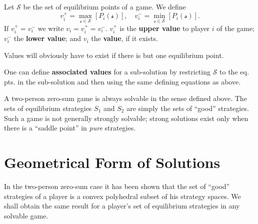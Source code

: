 \begin{definition}[Values]
    Let $\mathcal{S} $ be the set of equilibrium points of a game. We define \[
        v_i ^+ = \underset{\mathcal{s} \in \mathcal{S} }{\max} \left[ P_i (\mathcal{s} ) \right] , \quad v_i ^- = \underset{\mathcal{s} \in \mathcal{S} }{\min} \left[ P_i (\mathcal{s} ) \right] .
    \] If $v_i ^+=v_i ^-$ we write $v_i =v_i ^+=v_i ^-$. $v_i ^+$ is the \textbf{upper value} to player $i$ of the game; $v_i ^-$ the \textbf{lower value}; and $v_i $ the \textbf{value}, if it exists.

Values will obviously have to exist if there is but one equilibrium point.
\end{definition}
One can define \textbf{associated values} for a sub-solution by restricting $\mathcal{S} $ to the eq. pts. in the sub-solution and then using the same defining equations as above. 

A two-person zero-sum game is always solvable in the sense defined above. The sets of equilibrium strategies $S_1 $ and $S_2$ are simply the sets of ``good'' strategies. Such a game is not generally strongly solvable; strong solutions exist only when there is a ``saddle point'' in \emph{pure} strategies.

\section{Geometrical Form of Solutions}
\hspace{\parindent}In the two-person zero-sum case it has been shown that the set of ``good'' strategies of a player is a convex polyhedral subset of his strategy spaces. We shall obtain the same result for a player's set of equilibrium strategies in any solvable game.

